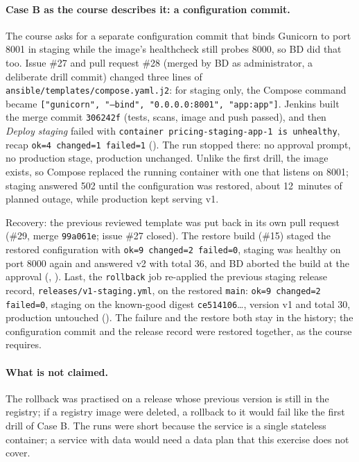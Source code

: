 \paragraph{Case B as the course describes it: a configuration commit.} The course asks for a separate configuration commit that binds Gunicorn to port 8001 in staging while the image's healthcheck still probes 8000, so BD did that too. Issue \#27 and pull request \#28 (merged by BD as administrator, a deliberate drill commit) changed three lines of \texttt{ansible/templates/compose.yaml.j2}: for staging only, the Compose command became \texttt{["gunicorn", "--bind", "0.0.0.0:8001", "app:app"]}. Jenkins built the merge commit \texttt{306242f} (tests, scans, image and push passed), and then \emph{Deploy staging} failed with \texttt{container pricing-staging-app-1 is unhealthy}, recap \texttt{ok=4 changed=1 failed=1} (). The run stopped there: no approval prompt, no production stage, production unchanged. Unlike the first drill, the image exists, so Compose replaced the running container with one that listens on 8001; staging answered 502 until the configuration was restored, about 12~minutes of planned outage, while production kept serving v1.

Recovery: the previous reviewed template was put back in its own pull request (\#29, merge \texttt{99a061e}; issue \#27 closed). The restore build (\#15) staged the restored configuration with \texttt{ok=9 changed=2 failed=0}, staging was healthy on port 8000 again and answered v2 with total 36, and BD aborted the build at the approval (, ). Last, the \texttt{rollback} job re-applied the previous staging release record, \texttt{releases/v1-staging.yml}, on the restored \texttt{main}: \texttt{ok=9 changed=2 failed=0}, staging on the known-good digest \texttt{ce514106}\ldots, version v1 and total 30, production untouched (). The failure and the restore both stay in the history; the configuration commit and the release record were restored together, as the course requires.

\paragraph{What is not claimed.} The rollback was practised on a release whose previous version is still in the registry; if a registry image were deleted, a rollback to it would fail like the first drill of Case B. The runs were short because the service is a single stateless container; a service with data would need a data plan that this exercise does not cover.

